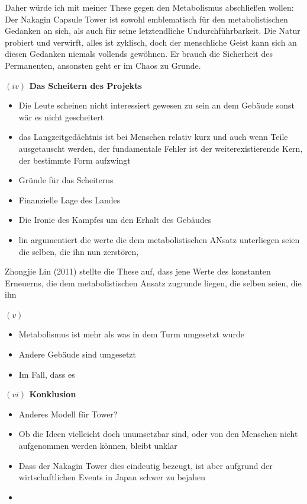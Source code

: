 \documentclass[a4paper, 12pt]{article}
\begin{document}
\begin{onehalfspace}
Daher würde ich mit meiner These gegen den Metabolismus abschließen wollen: Der Nakagin Capsule Tower ist sowohl emblematisch für den metabolistischen Gedanken an sich, als auch für seine letztendliche Undurchführbarkeit. Die Natur probiert und verwirft, alles ist zyklisch, doch der menschliche Geist kann sich an diesen Gedanken niemals vollends gewöhnen. Er brauch die Sicherheit des Permanenten, ansonsten geht er im Chaos zu Grunde. 

\vspace{5mm}
\noindent\textbf{$(iv)$ Das Scheitern des Projekts}


\begin{itemize}
  \item Die Leute scheinen nicht interessiert gewesen zu sein an dem Gebäude sonst wär es nicht gescheitert
  \item das Langzeitgedächtnis ist bei Menschen relativ kurz und auch wenn Teile ausgetauscht werden, der fundamentale Fehler ist der weiterexistierende Kern, der bestimmte Form aufzwingt
  \item Gründe für das Scheiterns
  \item Finanzielle Lage des Landes
  \item Die Ironie des Kampfes um den Erhalt des Gebäudes
  \item lin argumentiert die werte die dem metabolistischen ANsatz unterliegen seien die selben, die ihn nun zerstören,
\end{itemize}

Zhongjie Lin (2011) stellte die These auf, dass jene Werte des konstanten Erneuerns, die dem metabolistischen Ansatz zugrunde liegen, die selben seien, die ihn 


\vspace{5mm}
\noindent\textbf{$(v)$ }



\begin{itemize}
  \item Metabolismus ist mehr als was in dem Turm umgesetzt wurde
  \item Andere Gebäude sind umgesetzt
  \item Im Fall, dass es 
\end{itemize}



\vspace{5mm}
\noindent\textbf{$(vi)$ Konklusion}

\begin{itemize}
  \item Anderes Modell für Tower?
  \item Ob die Ideen vielleicht doch unumsetzbar sind, oder von den Menschen nicht aufgenommen werden können, bleibt unklar
  \item Dass der Nakagin Tower dies eindeutig bezeugt, ist aber aufgrund der wirtschaftlichen Events in Japan schwer zu bejahen
  \item 
\end{itemize}


\end{onehalfspace}
\end{document}
